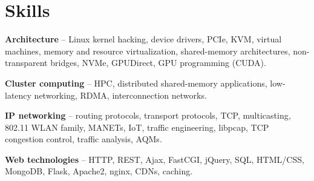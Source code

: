 
\section{Skills}
\begin{small}
	\parbox[t][][t]{\linewidth}{
		\textbf{Architecture} -- Linux kernel hacking, device drivers,
		PCIe, KVM, virtual machines, memory and resource virtualization,
		shared-memory architectures, non-transparent bridges, 
		NVMe, GPUDirect, GPU programming (CUDA).
		\smallbreak
	}
	\parbox[t][][t]{\linewidth}{
		\textbf{Cluster computing} -- HPC, distributed shared-memory applications, low-latency
		networking, RDMA, interconnection networks.
		\smallbreak
	}
	\parbox[t][][t]{\linewidth}{
		\textbf{IP networking} -- routing protocols, transport protocols, TCP,
		multicasting, 802.11 WLAN family, MANETs, IoT,  
		traffic engineering, libpcap, TCP congestion control, traffic
		analysis, AQMs. 
		\smallbreak
	}
	\parbox[t][][t]{\linewidth}{
		\textbf{Web technologies} -- HTTP, REST, Ajax, FastCGI, jQuery, 
		SQL, HTML/CSS, MongoDB, Flask, Apache2, nginx, CDNs, caching.
		\smallbreak
	}
\end{small}
